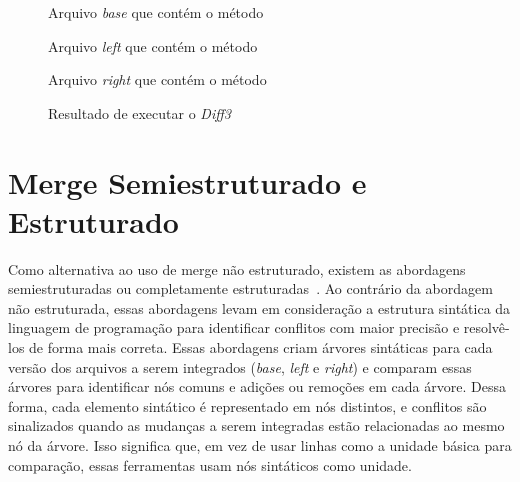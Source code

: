 \begin{figure}[ht]
	\begin{center}
		
		\caption{Arquivo \emph{base} que contém o método }\label{base_example}
	\end{center}
\end{figure}

\begin{figure}[ht]
	\begin{center}
		
		\caption{Arquivo \emph{left} que contém o método }\label{left_example}
	\end{center}
\end{figure}

\begin{figure}[ht]
	\begin{center}
		
		\caption{Arquivo \emph{right} que contém o método }\label{right_example}
	\end{center}
\end{figure}

\begin{figure}[ht]
	\begin{center}
		
	\end{center}
	\caption{Resultado de executar o \emph{Diff3}}\label{diff3_example}
\end{figure}

\section{Merge Semiestruturado e Estruturado}
Como alternativa ao uso de merge não estruturado, existem as abordagens
semiestruturadas ou completamente estruturadas~\cite{cavalcanti19}. Ao
contrário da abordagem não estruturada, essas abordagens levam em consideração
a estrutura sintática da linguagem de programação para identificar conflitos
com maior precisão e resolvê-los de forma mais correta. Essas abordagens criam
árvores sintáticas para cada versão dos arquivos a serem integrados
(\emph{base}, \emph{left} e \emph{right}) e comparam essas árvores para
identificar nós comuns e adições ou remoções em cada árvore. Dessa forma, cada
elemento sintático é representado em nós distintos, e conflitos são sinalizados
quando as mudanças a serem integradas estão relacionadas ao mesmo nó da árvore.
Isso significa que, em vez de usar linhas como a unidade básica para
comparação, essas ferramentas usam nós sintáticos como unidade.

